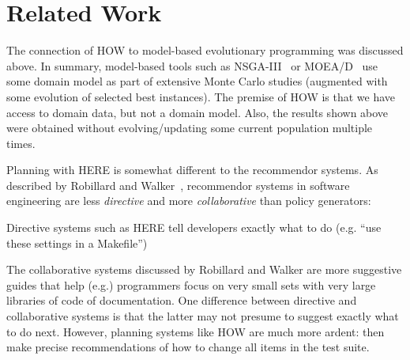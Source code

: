 

\section{Related Work}
The connection of HOW to model-based evolutionary programming was discussed above.
In summary,   model-based tools such as NSGA-III~\cite{deb14} or MOEA/D~\cite{zhang07:TEC}
use some domain model as part of extensive Monte Carlo studies (augmented with some
evolution of selected best instances).
The premise of HOW is that we have access to domain data, but not a domain model.
Also, the results shown above were obtained without evolving/updating some current population
multiple times.


Planning with HERE is somewhat different to the recommendor systems.
As described by Robillard and Walker~\cite{rob14}, recommendor systems
in software engineering
are less {\em directive} and more    {\em collaborative} than policy
generators:
\bi
\item
Directive systems such as HERE tell developers exactly what to do
(e.g. ``use these settings in a Makefile'') 
\item
The collaborative systems discussed by Robillard and Walker
are more suggestive guides that
help (e.g.) programmers focus on very small sets
with  very large libraries of code of documentation.
\ei
One difference between directive and collaborative systems is that
the latter may not presume to suggest exactly what to do next.
However, planning systems like HOW are much more ardent: then make precise recommendations
of how to change all items in the test suite.
 

